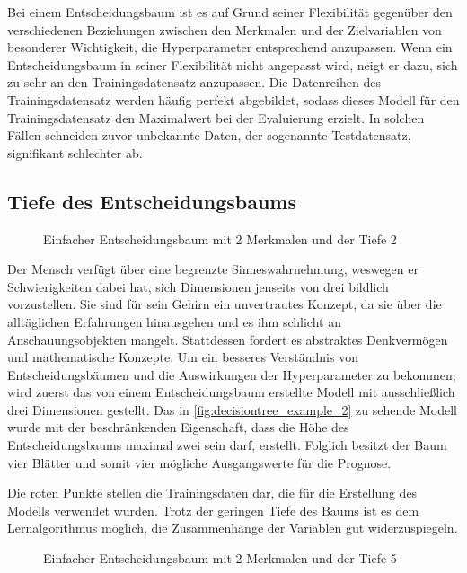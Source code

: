 \documentclass[12pt, a4paper]{article}
\begin{document}
Bei einem Entscheidungsbaum ist es auf Grund seiner Flexibilität gegenüber den verschiedenen Beziehungen zwischen den Merkmalen und der Zielvariablen von besonderer Wichtigkeit, die Hyperparameter entsprechend anzupassen. Wenn ein Entscheidungsbaum in seiner Flexibilität nicht angepasst wird, neigt er dazu, sich zu sehr an den Trainingsdatensatz anzupassen. Die Datenreihen des Trainingsdatensatz werden häufig perfekt abgebildet, sodass dieses Modell für den Trainingsdatensatz den Maximalwert bei der Evaluierung erzielt. In solchen Fällen schneiden zuvor unbekannte Daten, der sogenannte Testdatensatz, signifikant schlechter ab.

\subsection{Tiefe des Entscheidungsbaums}

\begin{figure}[H]
\centering
\def\svgwidth{350pt}

\caption{Einfacher Entscheidungsbaum mit 2 Merkmalen und der Tiefe 2}
\label{fig:decisiontree_example_2}
\end {figure}

Der Mensch verfügt über eine begrenzte Sinneswahrnehmung, weswegen er Schwierigkeiten dabei hat, sich Dimensionen jenseits von drei bildlich vorzustellen. Sie sind für sein Gehirn ein unvertrautes Konzept, da sie über die alltäglichen Erfahrungen hinausgehen und es ihm schlicht an Anschauungsobjekten mangelt. Stattdessen fordert es abstraktes Denkvermögen und mathematische Konzepte. Um ein besseres Verständnis von Entscheidungsbäumen und die Auswirkungen der Hyperparameter zu bekommen, wird zuerst das von einem Entscheidungsbaum erstellte Modell mit ausschließlich drei Dimensionen gestellt. Das in \autoref{fig:decisiontree_example_2} zu sehende Modell wurde mit der beschränkenden Eigenschaft, dass die Höhe des Entscheidungsbaums maximal zwei sein darf, erstellt. Folglich besitzt der Baum vier Blätter und somit vier mögliche Ausgangswerte für die Prognose. 

Die roten Punkte stellen die Trainingsdaten dar, die für die Erstellung des Modells verwendet wurden. Trotz der geringen Tiefe des Baums ist es dem Lernalgorithmus möglich, die Zusammenhänge der Variablen gut widerzuspiegeln.


\begin{figure}[H]
\centering
\def\svgwidth{350pt}

\caption{Einfacher Entscheidungsbaum mit 2 Merkmalen und der Tiefe 5}
\label{fig:decisiontree_example}
\end {figure}
\end{document}
